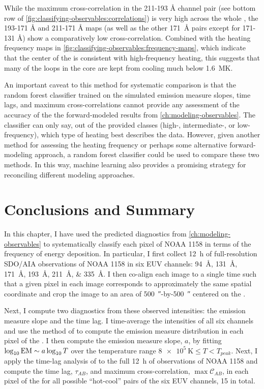 While the maximum cross-correlation in the 211-193 \si{\angstrom} channel pair (see bottom row of \autoref{fig:classifying-observables:correlations}) is very high across the whole \AR{}, the 193-171 \si{\angstrom} and 211-171 \si{\angstrom} maps (as well as the other \SI{171}{\angstrom} pairs except for 171-131 \si{\angstrom}) show a comparatively low cross-correlation. Combined with the heating frequency maps in \autoref{fig:classifying-observables:frequency-maps}, which indicate that the center of the \AR{} is consistent with high-frequency heating, this suggests that many of the loops in the core are kept from cooling much below \SI{1.6}{\mega\kelvin}.

An important caveat to this method for systematic comparison is that the random forest classifier trained on the simulated emission measure slopes, time lags, and maximum cross-correlations cannot provide any assessment of the accuracy of the the forward-modeled results from \autoref{ch:modeling-observables}. The classifier can only say, out of the provided classes (high-, intermediate-, or low-frequency), which type of heating best describes the data. However, given another method for assessing the heating frequency or perhaps some alternative forward-modeling approach, a random forest classifier could be used to compare these two methods. In this way, machine learning also provides a promising strategy for reconciling different modeling approaches.

\section{Conclusions and Summary}\label{sec:classifying-observables:conclusions}

In this chapter, I have used the predicted diagnostics from \autoref{ch:modeling-observables} to systematically classify each pixel of \AR{} NOAA 1158 in terms of the frequency of energy deposition. In particular, I first collect \SI{12}{\hour} of full-resolution SDO/AIA observations of NOAA 1158 in six EUV channels: \SIlist{94;131;171;193;211;335}{\angstrom}. I then co-align each image to a single time such that a given pixel in each image corresponds to approximately the same spatial coordinate and crop the image to an area of \SI{500}{\arcsecond}-by-\SI{500}{\arcsecond} centered on the \AR{}.

Next, I compute two diagnostics from these observed intensities: the emission measure slope and the time lag. I time-average the intensities of all six channels and use the method of \citet{hannah_differential_2012} to compute the emission measure distribution in each pixel of the \AR{}. I then compute the emission measure slope, $a$, by fitting $\log_{10}\textup{EM}\sim a\log_{10}T$ over the temperature range $\SI{8e5}{\kelvin}\le T < T_{peak}$. Next, I apply the time-lag analysis of \citet{viall_evidence_2012} to the full \SI{12}{\hour} of observations of NOAA 1158 and compute the time lag, $\tau_{AB}$, and maximum cross-correlation, $\max\mathcal{C}_{AB}$, in each pixel of the \AR{} for all possible ``hot-cool'' pairs of the six EUV channels, 15 in total.

